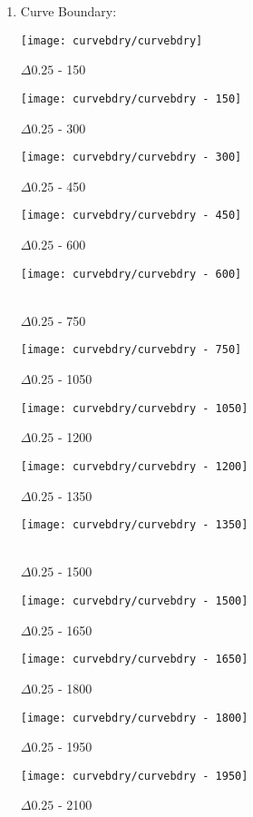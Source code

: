 \begin{enumerate}
  \newpage
  \item Curve Boundary:
  \begin{center}
    \texttt{[image: curvebdry/curvebdry]}
  \end{center}

    \begin{multicols}{3}
    \begin{center}

    $\Delta 0.25$ - 150

    \texttt{[image: curvebdry/curvebdry - 150]}

    $\Delta 0.25$ - 300

    \texttt{[image: curvebdry/curvebdry - 300]}

    $\Delta 0.25$ - 450

    \texttt{[image: curvebdry/curvebdry - 450]}

    $\Delta 0.25$ - 600

    \texttt{[image: curvebdry/curvebdry - 600]}

    \ \\
    $\Delta 0.25$ - 750

    \texttt{[image: curvebdry/curvebdry - 750]}

    $\Delta 0.25$ - 1050

    \texttt{[image: curvebdry/curvebdry - 1050]}

    $\Delta 0.25$ - 1200

    \texttt{[image: curvebdry/curvebdry - 1200]}

    $\Delta 0.25$ - 1350

    \texttt{[image: curvebdry/curvebdry - 1350]}

    \ \\
    $\Delta 0.25$ - 1500

    \texttt{[image: curvebdry/curvebdry - 1500]}

    $\Delta 0.25$ - 1650

    \texttt{[image: curvebdry/curvebdry - 1650]}

    $\Delta 0.25$ - 1800

    \texttt{[image: curvebdry/curvebdry - 1800]}

    $\Delta 0.25$ - 1950

    \texttt{[image: curvebdry/curvebdry - 1950]}

  \end{center}
  \newpage
  \begin{center}
    $\Delta 0.25$ - 2100


\end{center}
\end{multicols}
\end{enumerate}
